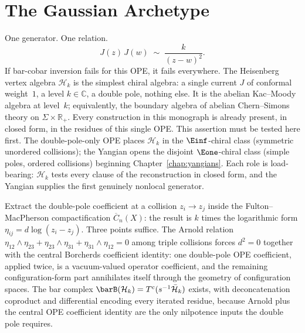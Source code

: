 \chapter{The Gaussian Archetype}\label{ch:heisenberg-frame}

One generator. One relation.
\[
J(z)\,J(w) \;\sim\; \frac{k}{(z-w)^2}.
\]
If bar-cobar inversion fails for this OPE, it fails everywhere.
The Heisenberg vertex algebra $\mathcal{H}_k$ is the simplest
chiral algebra: a single current $J$ of conformal weight~$1$,
a level $k \in \mathbb{C}$, a double pole, nothing else. It is
the abelian Kac--Moody algebra at level~$k$; equivalently, the
boundary algebra of abelian Chern--Simons theory on $\Sigma \times
\mathbb{R}_+$. Every construction in this monograph is already
present, in closed form, in the residues of this single OPE.
This assertion must be tested here first.
The double-pole-only OPE places $\mathcal{H}_k$ in the
$\Einf$-chiral class (symmetric unordered collisions); the
Yangian opens the disjoint $\Eone$-chiral class (simple poles,
ordered collisions) beginning Chapter~\ref{chap:yangians}.
Each role is load-bearing: $\mathcal{H}_k$ tests every clause of
the reconstruction in closed form, and the Yangian supplies the
first genuinely nonlocal generator.

Extract the double-pole coefficient at a collision $z_i \to z_j$
inside the Fulton--MacPherson compactification
$\overline{C}_n(X)$: the result is $k$ times the logarithmic
form $\eta_{ij} = d\log(z_i - z_j)$. Three points suffice.
The Arnold relation
$\eta_{12}\wedge\eta_{23} + \eta_{23}\wedge\eta_{31}
+ \eta_{31}\wedge\eta_{12} = 0$ among triple collisions forces
$d^2 = 0$ together with the central Borcherds coefficient identity:
one double-pole OPE coefficient, applied twice, is a vacuum-valued
operator coefficient, and the remaining configuration-form part
annihilates itself through the geometry of configuration spaces.
The bar complex $\barB(\mathcal{H}_k) = T^c(s^{-1}\bar{\mathcal{H}}_k)$
exists, with deconcatenation coproduct and differential
encoding every iterated residue, because Arnold plus the central
OPE coefficient identity are the only nilpotence inputs the
double pole requires.

